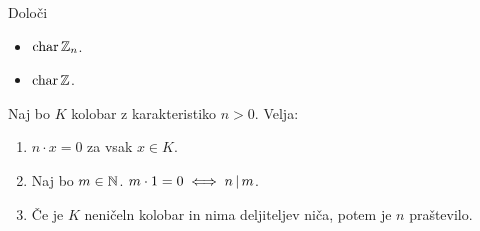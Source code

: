 \begin{primer}
    Določi
    \begin{itemize}
        \item $\operatorname{char} \mathbb{Z}_n$.
        \item $\operatorname{char} \mathbb{Z}$.
    \end{itemize}
\end{primer}

\begin{trditev}
    Naj bo $K$ kolobar z karakteristiko $n > 0$. Velja:
    \begin{enumerate}
        \item $n \cdot x = 0$ za vsak $x \in K$.
        \item Naj bo $m \in \mathbb{N}$. $m \cdot 1 = 0 \iff n \, |  \, m$.
        \item Če je $K$ neničeln kolobar in nima deljiteljev niča, potem je $n$ praštevilo.
    \end{enumerate}
\end{trditev}